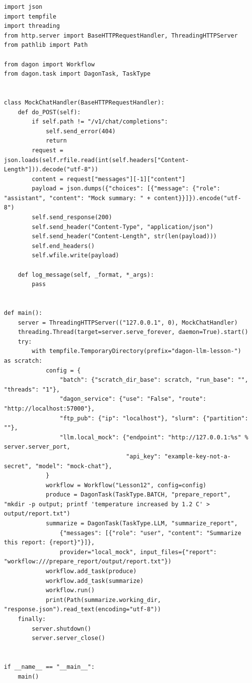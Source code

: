 \begin{lstlisting}[caption={\texttt{llm\_workflow.py}: a self-contained, mock-backed LLM workflow.}]
import json
import tempfile
import threading
from http.server import BaseHTTPRequestHandler, ThreadingHTTPServer
from pathlib import Path

from dagon import Workflow
from dagon.task import DagonTask, TaskType


class MockChatHandler(BaseHTTPRequestHandler):
    def do_POST(self):
        if self.path != "/v1/chat/completions":
            self.send_error(404)
            return
        request = json.loads(self.rfile.read(int(self.headers["Content-Length"])).decode("utf-8"))
        content = request["messages"][-1]["content"]
        payload = json.dumps({"choices": [{"message": {"role": "assistant", "content": "Mock summary: " + content}}]}).encode("utf-8")
        self.send_response(200)
        self.send_header("Content-Type", "application/json")
        self.send_header("Content-Length", str(len(payload)))
        self.end_headers()
        self.wfile.write(payload)

    def log_message(self, _format, *_args):
        pass


def main():
    server = ThreadingHTTPServer(("127.0.0.1", 0), MockChatHandler)
    threading.Thread(target=server.serve_forever, daemon=True).start()
    try:
        with tempfile.TemporaryDirectory(prefix="dagon-llm-lesson-") as scratch:
            config = {
                "batch": {"scratch_dir_base": scratch, "run_base": "", "threads": "1"},
                "dagon_service": {"use": "False", "route": "http://localhost:57000"},
                "ftp_pub": {"ip": "localhost"}, "slurm": {"partition": ""},
                "llm.local_mock": {"endpoint": "http://127.0.0.1:%s" % server.server_port,
                                   "api_key": "example-key-not-a-secret", "model": "mock-chat"},
            }
            workflow = Workflow("Lesson12", config=config)
            produce = DagonTask(TaskType.BATCH, "prepare_report", "mkdir -p output; printf 'temperature increased by 1.2 C' > output/report.txt")
            summarize = DagonTask(TaskType.LLM, "summarize_report",
                {"messages": [{"role": "user", "content": "Summarize this report: {report}"}]},
                provider="local_mock", input_files={"report": "workflow:///prepare_report/output/report.txt"})
            workflow.add_task(produce)
            workflow.add_task(summarize)
            workflow.run()
            print(Path(summarize.working_dir, "response.json").read_text(encoding="utf-8"))
    finally:
        server.shutdown()
        server.server_close()


if __name__ == "__main__":
    main()
\end{lstlisting}

